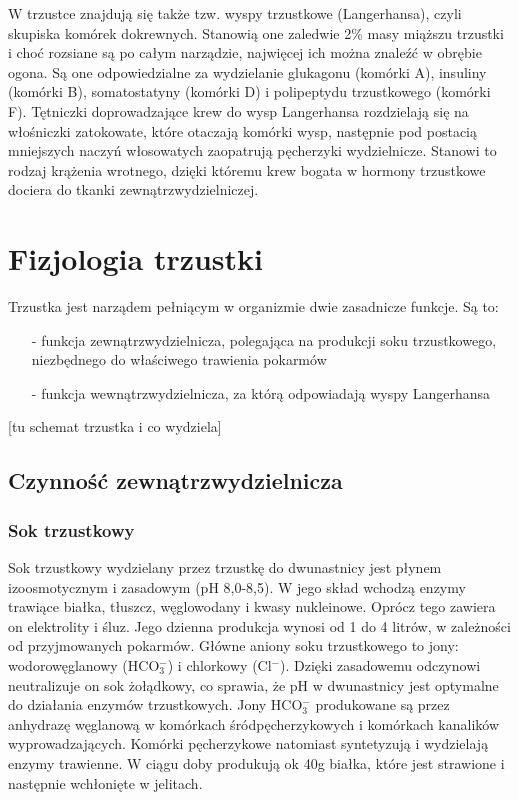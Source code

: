 \documentclass[a4paper, 12pt]{report}
\begin{document}
W trzustce znajdują się także tzw. wyspy trzustkowe (Langerhansa),
czyli skupiska komórek dokrewnych. Stanowią one zaledwie 2\% masy
miąższu trzustki i choć rozsiane są po całym narządzie, najwięcej
ich można znaleźć w obrębie ogona. Są one odpowiedzialne za
wydzielanie glukagonu (komórki A), insuliny (komórki B), somatostatyny
(komórki D) i polipeptydu trzustkowego (komórki F). Tętniczki
doprowadzające krew do wysp Langerhansa rozdzielają się na włośniczki
zatokowate, które otaczają komórki wysp, następnie pod postacią
mniejszych naczyń włosowatych zaopatrują pęcherzyki wydzielnicze. 
Stanowi to rodzaj krążenia wrotnego, dzięki któremu krew bogata w
hormony trzustkowe dociera do tkanki
zewnątrzwydzielniczej.\cite{szczeklik}\cite{traczyk}

\chapter{Fizjologia trzustki}
Trzustka jest narządem pełniącym w organizmie dwie zasadnicze
funkcje. Są to:
\begin{itemize}
\item[-] funkcja zewnątrzwydzielnicza, polegająca na produkcji soku
  trzustkowego, niezbędnego do właściwego trawienia pokarmów
\item[-] funkcja wewnątrzwydzielnicza, za którą odpowiadają wyspy
  Langerhansa
\end{itemize}

[tu schemat trzustka i co wydziela]

\section{Czynność zewnątrzwydzielnicza}
\subsection{Sok trzustkowy}
Sok trzustkowy wydzielany przez trzustkę do dwunastnicy jest płynem
izoosmotycznym i zasadowym (pH 8,0-8,5). W jego skład wchodzą enzymy
trawiące białka, tłuszcz, węglowodany i kwasy nukleinowe. Oprócz tego
zawiera on elektrolity i śluz. Jego dzienna produkcja wynosi od 1 do 4
litrów, w zależności od przyjmowanych pokarmów. Główne aniony soku
trzustkowego to jony: wodorowęglanowy (HCO$_3^-$) i chlorkowy
(Cl$^-$). Dzięki zasadowemu odczynowi neutralizuje on sok żołądkowy, 
co sprawia, że pH w dwunastnicy jest optymalne do działania enzymów
trzustkowych. Jony HCO$_3^-$ produkowane są przez anhydrazę węglanową
w komórkach śródpęcherzykowych i komórkach kanalików wyprowadzających.
Komórki pęcherzykowe natomiast syntetyzują i wydzielają enzymy
trawienne. W ciągu doby produkują ok 40g białka, które jest strawione
i następnie wchłonięte w jelitach\cite{szczeklik}.
\end{document}
